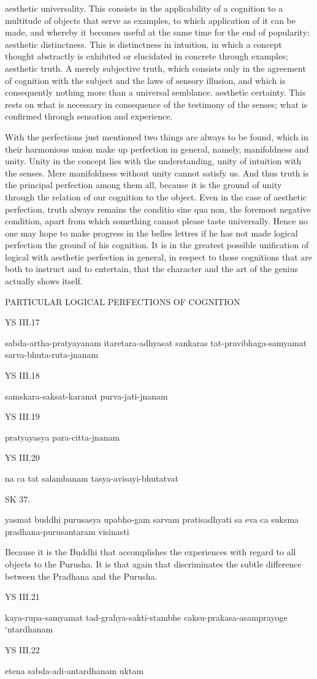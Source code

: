 aesthetic universality.
    This consists in the applicability of a cognition to a
    multitude of objects that serve as examples,
    to which application of it can be made,
    and whereby it becomes useful at the same time for the end of popularity;
aesthetic distinctness.
    This is distinctness in intuition, in which a concept
    thought abstractly is exhibited or elucidated in concrete through examples;
aesthetic truth.
    A merely subjective truth, which consists only in the agreement
    of cognition with the subject and the laws of sensory illusion,
    and which is consequently nothing more than a universal semblance.
aesthetic certainty.
    This rests on what is necessary in consequence of
    the testimony of the senses;
    what is confirmed through sensation and experience.

With the perfections just mentioned two things are always to be found,
which in their harmonious union make up perfection in general,
namely, manifoldness and unity.
Unity in the concept lies with the understanding,
unity of intuition with the senses.
Mere manifoldness without unity cannot satisfy us.
And thus truth is the principal perfection among them all,
because it is the ground of unity through
the relation of our cognition to the object.
Even in the case of aesthetic perfection,
truth always remains the conditio sine qua non,
the foremost negative condition,
apart from which something cannot please taste universally.
Hence no one may hope to make progress in the belles lettres
if he has not made logical perfection the ground of his cognition.
It is in the greatest possible unification of
logical with aesthetic perfection in general,
in respect to those cognitions that are both
to instruct and to entertain,
that the character and the art of
the genius actually shows itself.

PARTICULAR LOGICAL PERFECTIONS OF COGNITION

YS III.17

    sabda-artha-pratyayanam itaretara-adhyasat sankaras tat-pravibhaga-samyamat sarva-bhuta-ruta-jnanam

YS III.18

    samskara-saksat-karanat purva-jati-jnanam

YS III.19

    pratyayasya para-citta-jnanam

YS III.20

    na ca tat salambanam tasya-avisayi-bhutatvat

SK 37.

yasmat buddhi purusasya upabho-gam sarvam pratisadhyati
sa eva ca suksma pradhana-purusantaram visinasti

Because it is the Buddhi that accomplishes the experiences
with regard to all objects to the Purusha.
It is that again that discriminates the subtle difference
between the Pradhana and the Purusha.

YS III.21

    kaya-rupa-samyamat tad-grahya-sakti-stambhe caksu-prakasa-asamprayoge ‘ntardhanam

YS III.22

    etena sabda-adi-antardhanam uktam
